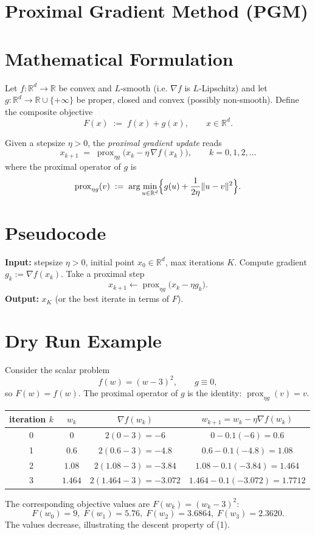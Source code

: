 \documentclass{article}
\newcommand{\prox}{\operatorname{prox}}
\newcommand{\R}{\mathbb{R}}
\begin{document}
\section*{Proximal Gradient Method (PGM)}

\section*{Mathematical Formulation}
Let $f:\R^{d}\to\R$ be convex and $L$‑smooth (i.e. $\nabla f$ is $L$‑Lipschitz) and let $g:\R^{d}\to\R\cup\{+\infty\}$ be proper, closed and convex (possibly non‑smooth).  
Define the composite objective
\[
F(x)\;:=\;f(x)+g(x),\qquad x\in\R^{d}.
\]

Given a stepsize $\eta>0$, the \emph{proximal gradient update} reads
\begin{equation}
\boxed{\;
x_{k+1}\;=\;\prox_{\eta g}\!\bigl(x_{k}-\eta\,\nabla f(x_{k})\bigr),\qquad k=0,1,2,\dots
\;}
\tag{1}
\end{equation}
where the proximal operator of $g$ is
\[
\prox_{\eta g}(v)\;:=\;\arg\min_{u\in\R^{d}}\Bigl\{ g(u)+\frac{1}{2\eta}\|u-v\|^{2}\Bigr\}.
\]

\section*{Pseudocode}
\begin{algorithm}[H]
\caption{Proximal Gradient Method}
\begin{algorithmic}[1]
\STATE \textbf{Input:} stepsize $\eta>0$, initial point $x_{0}\in\R^{d}$, max iterations $K$.
    \STATE Compute gradient $g_{k}:=\nabla f(x_{k})$.
    \STATE Take a proximal step 
    \[
    x_{k+1}\gets \prox_{\eta g}\bigl(x_{k}-\eta g_{k}\bigr).
    \]
\ENDFOR
\STATE \textbf{Output:} $x_{K}$ (or the best iterate in terms of $F$).
\end{algorithmic}
\end{algorithm}

\section*{Dry Run Example}
Consider the scalar problem
\[
f(w)=(w-3)^{2},\qquad g\equiv0,
\]
so $F(w)=f(w)$.  The proximal operator of $g$ is the identity: $\prox_{\eta g}(v)=v$.

\begin{center}
\begin{tabular}{c|c|c|c}
iteration $k$ & $w_{k}$ & $\nabla f(w_{k})$ & $w_{k+1}=w_{k}-\eta\nabla f(w_{k})$\\ \hline
0 & $0$ & $2(0-3)=-6$ & $0-0.1(-6)=0.6$\\
1 & $0.6$ & $2(0.6-3)=-4.8$ & $0.6-0.1(-4.8)=1.08$\\
2 & $1.08$ & $2(1.08-3)=-3.84$ & $1.08-0.1(-3.84)=1.464$\\
3 & $1.464$ & $2(1.464-3)=-3.072$ & $1.464-0.1(-3.072)=1.7712$
\end{tabular}
\end{center}
The corresponding objective values are $F(w_{k})=(w_{k}-3)^{2}$:
\[
F(w_{0})=9,\;F(w_{1})=5.76,\;F(w_{2})=3.6864,\;F(w_{3})=2.3620.
\]
The values decrease, illustrating the descent property of (1).
\end{document}
